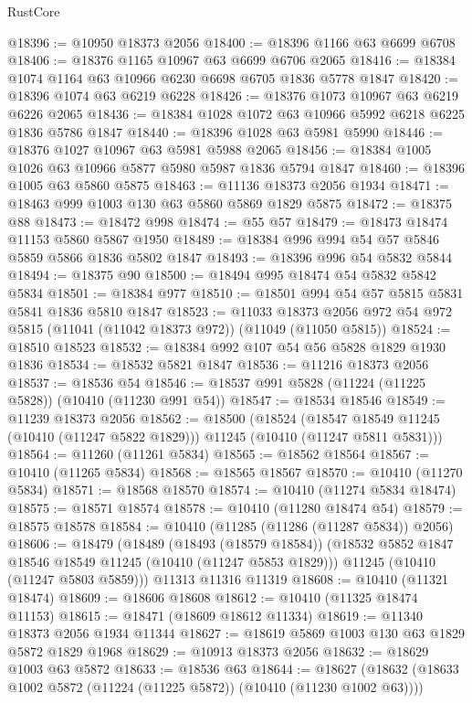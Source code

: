 \begin{lexlean}{RustCore}
\begin{coremodule}
@18396 := @10950 @18373 @2056
@18400 := @18396 @1166 @63 @6699 @6708
@18406 := @18376 @1165 @10967 @63 @6699 @6706 @2065
@18416 := @18384 @1074 @1164 @63 @10966 @6230 @6698 @6705 @1836 @5778 @1847
@18420 := @18396 @1074 @63 @6219 @6228
@18426 := @18376 @1073 @10967 @63 @6219 @6226 @2065
@18436 := @18384 @1028 @1072 @63 @10966 @5992 @6218 @6225 @1836 @5786 @1847
@18440 := @18396 @1028 @63 @5981 @5990
@18446 := @18376 @1027 @10967 @63 @5981 @5988 @2065
@18456 := @18384 @1005 @1026 @63 @10966 @5877 @5980 @5987 @1836 @5794 @1847
@18460 := @18396 @1005 @63 @5860 @5875
@18463 := @11136 @18373 @2056 @1934
@18471 := @18463 @999 @1003 @130 @63 @5860 @5869 @1829 @5875
@18472 := @18375 @88
@18473 := @18472 @998
@18474 := @55 @57
@18479 := @18473 @18474 @11153 @5860 @5867 @1950
@18489 := @18384 @996 @994 @54 @57 @5846 @5859 @5866 @1836 @5802 @1847
@18493 := @18396 @996 @54 @5832 @5844
@18494 := @18375 @90
@18500 := @18494 @995 @18474 @54 @5832 @5842 @5834
@18501 := @18384 @977
@18510 := @18501 @994 @54 @57 @5815 @5831 @5841 @1836 @5810 @1847
@18523 := @11033
    @18373
    @2056
    @972
    @54
    @972
    @5815
    (@11041 (@11042 @18373 @972))
    (@11049 (@11050 @5815))
@18524 := @18510 @18523
@18532 := @18384 @992 @107 @54 @56 @5828 @1829 @1930 @1836
@18534 := @18532 @5821 @1847
@18536 := @11216 @18373 @2056
@18537 := @18536 @54
@18546 := @18537 @991 @5828 (@11224 (@11225 @5828)) (@10410 (@11230 @991 @54))
@18547 := @18534 @18546
@18549 := @11239 @18373 @2056
@18562 := @18500
    (@18524
      (@18547 @18549 @11245 (@10410 (@11247 @5822 @1829)))
      @11245
      (@10410 (@11247 @5811 @5831)))
@18564 := @11260 (@11261 @5834)
@18565 := @18562 @18564
@18567 := @10410 (@11265 @5834)
@18568 := @18565 @18567
@18570 := @10410 (@11270 @5834)
@18571 := @18568 @18570
@18574 := @10410 (@11274 @5834 @18474)
@18575 := @18571 @18574
@18578 := @10410 (@11280 @18474 @54)
@18579 := @18575 @18578
@18584 := @10410 (@11285 (@11286 (@11287 @5834)) @2056)
@18606 := @18479
    (@18489
      (@18493 (@18579 @18584))
      (@18532 @5852 @1847 @18546 @18549 @11245 (@10410 (@11247 @5853 @1829)))
      @11245
      (@10410 (@11247 @5803 @5859)))
    @11313
    @11316
    @11319
@18608 := @10410 (@11321 @18474)
@18609 := @18606 @18608
@18612 := @10410 (@11325 @18474 @11153)
@18615 := @18471 (@18609 @18612 @11334)
@18619 := @11340 @18373 @2056 @1934 @11344
@18627 := @18619 @5869 @1003 @130 @63 @1829 @5872 @1829 @1968
@18629 := @10913 @18373 @2056
@18632 := @18629 @1003 @63 @5872
@18633 := @18536 @63
@18644 := @18627 (@18632 (@18633 @1002 @5872 (@11224 (@11225 @5872)) (@10410 (@11230 @1002 @63))))

\end{coremodule}
\end{lexlean}

